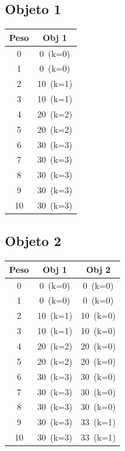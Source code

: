\documentclass[12pt]{article}
\begin{document}
\subsection*{Objeto 1}
\begin{longtable}{cc}
\toprule
Peso & Obj 1 \\
\midrule
0 & \cellcolor{red!20}0~(k=0) \\
1 & \cellcolor{red!20}0~(k=0) \\
2 & \cellcolor{green!40}10~(k=1) \\
3 & \cellcolor{green!40}10~(k=1) \\
4 & \cellcolor{green!40}20~(k=2) \\
5 & \cellcolor{green!40}20~(k=2) \\
6 & \cellcolor{green!40}30~(k=3) \\
7 & \cellcolor{green!40}30~(k=3) \\
8 & \cellcolor{green!40}30~(k=3) \\
9 & \cellcolor{green!40}30~(k=3) \\
10 & \cellcolor{green!40}30~(k=3) \\
\bottomrule
\end{longtable}
\subsection*{Objeto 2}
\begin{longtable}{ccc}
\toprule
Peso & Obj 1 & Obj 2 \\
\midrule
0 & \cellcolor{red!20}0~(k=0) & \cellcolor{red!20}0~(k=0) \\
1 & \cellcolor{red!20}0~(k=0) & \cellcolor{red!20}0~(k=0) \\
2 & \cellcolor{green!40}10~(k=1) & \cellcolor{red!20}10~(k=0) \\
3 & \cellcolor{green!40}10~(k=1) & \cellcolor{red!20}10~(k=0) \\
4 & \cellcolor{green!40}20~(k=2) & \cellcolor{red!20}20~(k=0) \\
5 & \cellcolor{green!40}20~(k=2) & \cellcolor{red!20}20~(k=0) \\
6 & \cellcolor{green!40}30~(k=3) & \cellcolor{red!20}30~(k=0) \\
7 & \cellcolor{green!40}30~(k=3) & \cellcolor{red!20}30~(k=0) \\
8 & \cellcolor{green!40}30~(k=3) & \cellcolor{red!20}30~(k=0) \\
9 & \cellcolor{green!40}30~(k=3) & \cellcolor{green!40}33~(k=1) \\
10 & \cellcolor{green!40}30~(k=3) & \cellcolor{green!40}33~(k=1) \\
\bottomrule
\end{longtable}
\end{document}
